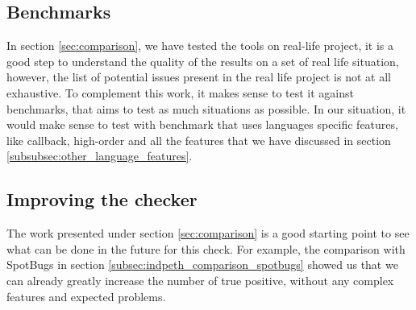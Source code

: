 \subsection{Benchmarks}
\label{subsec:benchmarks}

In section \ref{sec:comparison}, we have tested the tools on real-life project, it is a good step to understand the quality of the results on a set of real life situation, 
however, the list of potential issues present in the real life project is not at all exhaustive. To complement this work, it makes sense to test it against benchmarks, that aims to test as much situations as possible. 
In our situation, it would make sense to test with benchmark that uses languages specific features, like callback, high-order and all the features that we have discussed in section \ref{subsubsec:other_language_features}.

\subsection{Improving the checker}
\label{subsec:future_improving_checker}

The work presented under section \ref{sec:comparison} is a good starting point to see what can be done in the future for this check. 
For example, the comparison with SpotBugs in section \ref{subsec:indpeth_comparison_spotbugs} showed us that we can already greatly increase the number of true positive, without any complex features and expected problems.